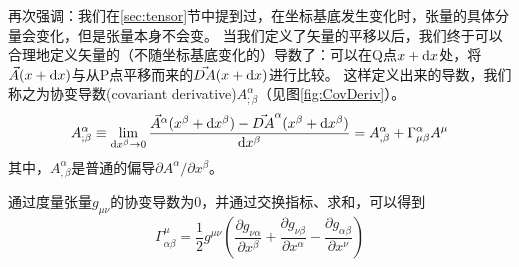 再次强调：我们在\ref{sec:tensor}节中提到过，在坐标基底发生变化时，张量的具体分量会变化，但是张量本身不会变。
当我们定义了矢量的平移以后，我们终于可以合理地定义矢量的（不随坐标基底变化的）导数了：可以在Q点$x+{\rm d}x$处，将$\vec{A}(x+{\rm d}x)$与从P点平移而来的$\vec{DA}(x+{\rm d}x)$进行比较。
这样定义出来的导数，我们称之为协变导数(covariant derivative)$A^\alpha_{; \beta}$（见图\ref{fig:CovDeriv}）。
\begin{equation}\label{eq:CovDeriv}
A^\alpha_{; \beta} \equiv \lim_{{\rm d}x^\beta \to 0}\frac{\vec{A}^\alpha(x^\beta+{\rm d}x^\beta)-\vec{DA}^\alpha(x^\beta+{\rm d}x^\beta)}{{\rm d}x^\beta} =A^\alpha_{, \beta} + \Gamma^\alpha_{\mu\beta}A^\mu
\end{equation}
其中，$A^\alpha_{, \beta}$是普通的偏导$\partial A^\alpha/\partial x^\beta$。

通过度量张量$g_{\mu\nu}$的协变导数为0，并通过交换指标、求和，可以得到
\begin{equation}\label{eq:ChristoffelDef}
\Gamma _{{\alpha\beta}}^{\mu}={\frac  {1}{2}}g^{{\mu\nu}}\left({\frac  {\partial g_{{\nu\alpha}}}{\partial x^{\beta}}}+{\frac  {\partial g_{{\nu\beta}}}{\partial x^{\alpha}}}-{\frac  {\partial g_{{\alpha\beta}}}{\partial x^{\nu}}}\right)
\end{equation}

